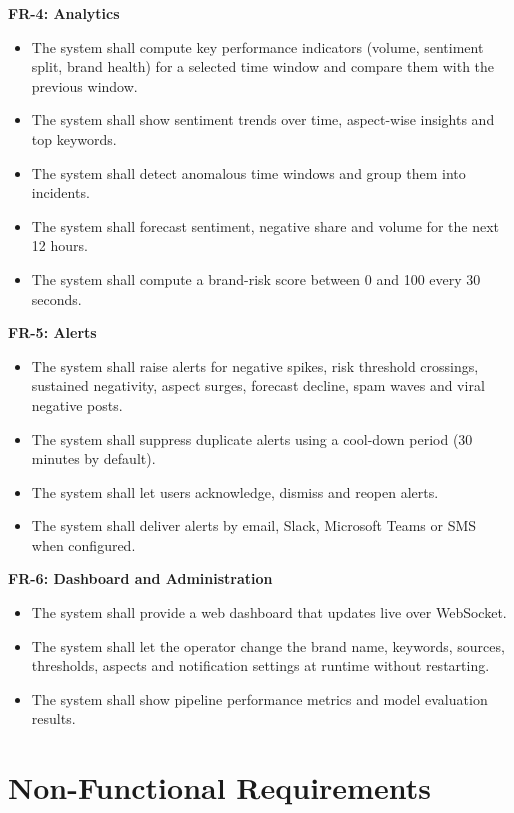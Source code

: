 \documentclass[12pt,a4paper]{report}
\begin{document}
\textbf{FR-4: Analytics}
\begin{itemize}
    \item The system shall compute key performance indicators (volume, sentiment split, brand health) for a selected time window and compare them with the previous window.
    \item The system shall show sentiment trends over time, aspect-wise insights and top keywords.
    \item The system shall detect anomalous time windows and group them into incidents.
    \item The system shall forecast sentiment, negative share and volume for the next 12 hours.
    \item The system shall compute a brand-risk score between 0 and 100 every 30 seconds.
\end{itemize}

\textbf{FR-5: Alerts}
\begin{itemize}
    \item The system shall raise alerts for negative spikes, risk threshold crossings, sustained negativity, aspect surges, forecast decline, spam waves and viral negative posts.
    \item The system shall suppress duplicate alerts using a cool-down period (30 minutes by default).
    \item The system shall let users acknowledge, dismiss and reopen alerts.
    \item The system shall deliver alerts by email, Slack, Microsoft Teams or SMS when configured.
\end{itemize}

\textbf{FR-6: Dashboard and Administration}
\begin{itemize}
    \item The system shall provide a web dashboard that updates live over WebSocket.
    \item The system shall let the operator change the brand name, keywords, sources, thresholds, aspects and notification settings at runtime without restarting.
    \item The system shall show pipeline performance metrics and model evaluation results.
\end{itemize}

\section{Non-Functional Requirements}
\end{document}

